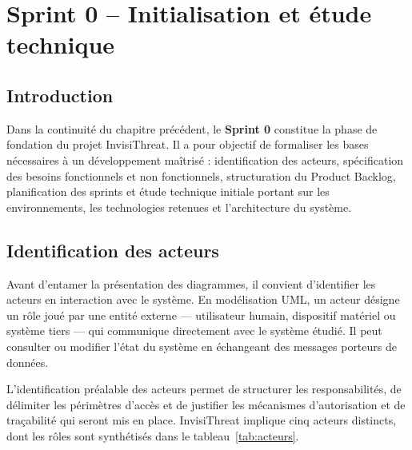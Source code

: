 \chapter{Sprint 0 -- Initialisation et étude technique}

\section{Introduction}

Dans la continuité du chapitre précédent, le \textbf{Sprint 0} constitue la phase de
fondation du projet InvisiThreat. Il a pour objectif de formaliser les bases nécessaires
à un développement maîtrisé : identification des acteurs, spécification des besoins
fonctionnels et non fonctionnels, structuration du Product Backlog, planification des
sprints et étude technique initiale portant sur les environnements, les technologies
retenues et l'architecture du système.

\section{Identification des acteurs}

Avant d'entamer la présentation des diagrammes, il convient d'identifier les acteurs
en interaction avec le système. En modélisation UML, un acteur désigne un rôle joué
par une entité externe — utilisateur humain, dispositif matériel ou système tiers —
qui communique directement avec le système étudié. Il peut consulter ou modifier
l'état du système en échangeant des messages porteurs de données.

L'identification préalable des acteurs permet de structurer les responsabilités,
de délimiter les périmètres d'accès et de justifier les mécanismes d'autorisation
et de traçabilité qui seront mis en place. InvisiThreat implique cinq acteurs
distincts, dont les rôles sont synthétisés dans le tableau~\ref{tab:acteurs}.

